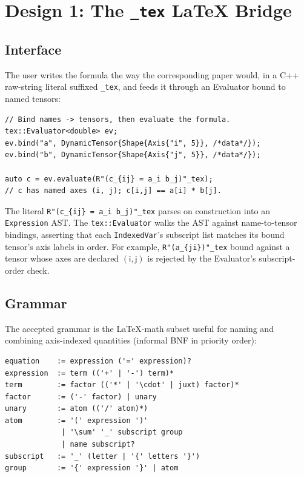 \documentclass[10pt,twocolumn]{article}
\newcommand{\ax}[1]{\textsf{#1}}                              %
\newcommand{\udltex}{\code{\_tex}}                            %
\newcommand{\code}[1]{\texttt{#1}}
\begin{document}
\section{Design 1: The \texorpdfstring{\udltex{}}{\_tex} LaTeX Bridge}
\label{sec:udl}


\subsection{Interface}
\label{sec:udl-interface}

The user writes the formula the way the corresponding paper would, in
a C++ raw-string literal suffixed \code{\_tex}, and feeds it through
an Evaluator bound to named tensors:

\begin{lstlisting}[language=cppx]
// Bind names -> tensors, then evaluate the formula.
tex::Evaluator<double> ev;
ev.bind("a", DynamicTensor{Shape{Axis{"i", 5}}, /*data*/});
ev.bind("b", DynamicTensor{Shape{Axis{"j", 5}}, /*data*/});

auto c = ev.evaluate(R"(c_{ij} = a_i b_j)"_tex);
// c has named axes (i, j); c[i,j] == a[i] * b[j].
\end{lstlisting}

The literal \code{R"(c\_\{ij\} = a\_i b\_j)"\_tex} parses on
construction into an \code{Expression} AST. The
\code{tex::Evaluator} walks the AST against name-to-tensor bindings,
asserting that each \code{IndexedVar}'s subscript list matches its
bound tensor's axis labels in order. For example,
\code{R"(a\_\{ji\})"\_tex} bound against a tensor whose axes are
declared $(\ax{i},\ax{j})$ is rejected by the Evaluator's
subscript-order check.

\subsection{Grammar}
\label{sec:udl-grammar}

The accepted grammar is the LaTeX-math subset useful for naming and
combining axis-indexed quantities (informal BNF in priority order):

\begin{lstlisting}[basicstyle=\ttfamily\footnotesize,numbers=none]
equation    := expression ('=' expression)?
expression  := term (('+' | '-') term)*
term        := factor (('*' | '\cdot' | juxt) factor)*
factor      := ('-' factor) | unary
unary       := atom (('/' atom)*)
atom        := '(' expression ')'
             | '\sum' '_' subscript group
             | name subscript?
subscript   := '_' (letter | '{' letters '}')
group       := '{' expression '}' | atom
\end{lstlisting}
\end{document}
